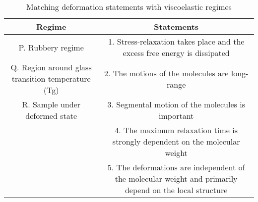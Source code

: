 \begin{table}[htbp]
\centering
\caption{Matching deformation statements with viscoelastic regimes}
\label{tab:tables/table5.tex}
\begin{tabular}{c|c}
\textbf{Regime} & \textbf{Statements} \\ \hline
P. Rubbery regime & 1. Stress-relaxation takes place and the excess free energy is dissipated \\
Q. Region around glass transition temperature (Tg) & 2. The motions of the molecules are long-range \\
R. Sample under deformed state & 3. Segmental motion of the molecules is important \\
 & 4. The maximum relaxation time is strongly dependent on the molecular weight \\
 & 5. The deformations are independent of the molecular weight and primarily depend on the local structure \\
\end{tabular}
\end{table}